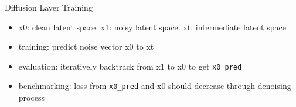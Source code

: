 




\begin{frame}{Diffusion Layer Training}
  \begin{itemize}
      \item x0: clean latent space. x1: noisy latent space. xt: intermediate latent space
      \item training: predict noise vector x0 to xt
      \item evaluation: iteratively backtrack from x1 to x0 to get \texttt{x0\_pred}
      \item benchmarking: loss from \texttt{x0\_pred} and x0 should decrease through denoising process
  \end{itemize}    
\end{frame}

